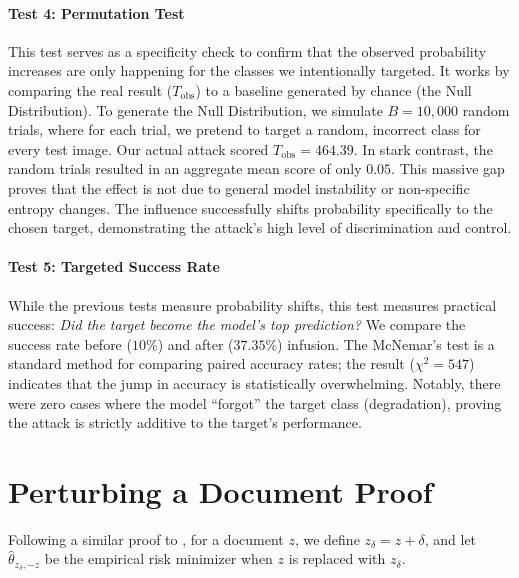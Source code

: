 \documentclass{article}
\theoremstyle{plain}
\theoremstyle{definition}
\theoremstyle{remark}
\begin{document}
\paragraph{Test 4: Permutation Test}
This test serves as a specificity check to confirm that the observed probability increases are only happening for the classes we intentionally targeted. It works by comparing the real result ($T_{\text{obs}}$) to a baseline generated by chance (the Null Distribution). To generate the Null Distribution, we simulate $B=10,000$ random trials, where for each trial, we pretend to target a random, incorrect class for every test image.
Our actual attack scored $T_{\text{obs}} = 464.39$. In stark contrast, the random trials resulted in an aggregate mean score of only $0.05$. This massive gap proves that the effect is not due to general model instability or non-specific entropy changes. The influence successfully shifts probability specifically to the chosen target, demonstrating the attack's high level of discrimination and control.

\paragraph{Test 5: Targeted Success Rate}
While the previous tests measure probability shifts, this test measures practical success: \textit{Did the target become the model's top prediction?} We compare the success rate before ($10\%$) and after ($37.35\%$) infusion. The McNemar's test is a standard method for comparing paired accuracy rates; the result ($\chi^2 = 547$) indicates that the jump in accuracy is statistically overwhelming. Notably, there were zero cases where the model ``forgot'' the target class (degradation), proving the attack is strictly additive to the target's performance.

\section{Perturbing a Document Proof}
\label{apndx_perturbing}

Following a similar proof to \citet{koh2017understanding}, for a document $z$, we define $z_\delta = z + \delta$, and let $\hat{\theta}_{z_\delta,-z}$ be the empirical risk minimizer when $z$ is replaced with $z_\delta$.
\end{document}

